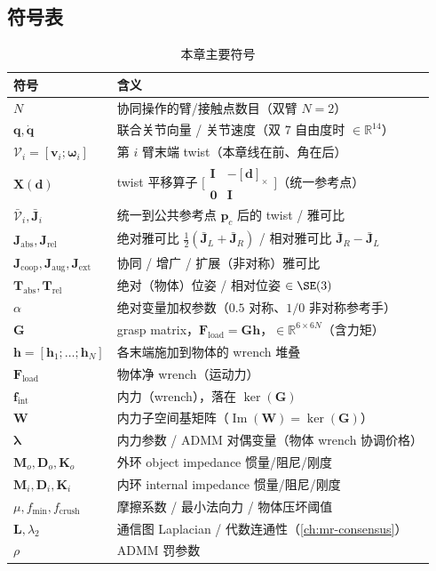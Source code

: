 \subsection*{符号表}
\begin{table}[H]\centering\small
\caption{本章主要符号}
\label{tab:ma-symbols}
\begin{tabular}{ll}
\toprule
符号 & 含义 \\
\midrule
$N$ & 协同操作的臂/接触点数目（双臂 $N=2$） \\
$\mathbf{q},\dot{\mathbf{q}}$ & 联合关节向量 / 关节速度（双 $7$ 自由度时 $\in\mathbb{R}^{14}$） \\
$\boldsymbol{\mathcal{V}}_i=[\mathbf{v}_i;\boldsymbol{\omega}_i]$ & 第 $i$ 臂末端 twist（本章线在前、角在后） \\
$\mathbf{X}(\mathbf{d})$ & twist 平移算子 $\big[\begin{smallmatrix}\mathbf{I}&-[\mathbf{d}]_\times\\\mathbf{0}&\mathbf{I}\end{smallmatrix}\big]$（统一参考点） \\
$\bar{\boldsymbol{\mathcal{V}}}_i,\bar{\mathbf{J}}_i$ & 统一到公共参考点 $\mathbf{p}_c$ 后的 twist / 雅可比 \\
$\mathbf{J}_{\text{abs}},\mathbf{J}_{\text{rel}}$ & 绝对雅可比 $\tfrac12(\bar{\mathbf{J}}_L+\bar{\mathbf{J}}_R)$ / 相对雅可比 $\bar{\mathbf{J}}_R-\bar{\mathbf{J}}_L$ \\
$\mathbf{J}_{\text{coop}},\mathbf{J}_{\text{aug}},\mathbf{J}_{\text{ext}}$ & 协同 / 增广 / 扩展（非对称）雅可比 \\
$\mathbf{T}_{\text{abs}},\mathbf{T}_{\text{rel}}$ & 绝对（物体）位姿 / 相对位姿 $\in\SE(3)$ \\
$\alpha$ & 绝对变量加权参数（$0.5$ 对称、$1/0$ 非对称参考手） \\
$\mathbf{G}$ & grasp matrix，$\mathbf{F}_{\text{load}}=\mathbf{G}\mathbf{h}$，$\in\mathbb{R}^{6\times6N}$（含力矩） \\
$\mathbf{h}=[\mathbf{h}_1;\dots;\mathbf{h}_N]$ & 各末端施加到物体的 wrench 堆叠 \\
$\mathbf{F}_{\text{load}}$ & 物体净 wrench（运动力） \\
$\mathbf{f}_{\text{int}}$ & 内力（wrench），落在 $\ker(\mathbf{G})$ \\
$\mathbf{W}$ & 内力子空间基矩阵（$\operatorname{Im}(\mathbf{W})=\ker(\mathbf{G})$） \\
$\boldsymbol{\lambda}$ & 内力参数 / ADMM 对偶变量（物体 wrench 协调价格） \\
$\mathbf{M}_o,\mathbf{D}_o,\mathbf{K}_o$ & 外环 object impedance 惯量/阻尼/刚度 \\
$\mathbf{M}_i,\mathbf{D}_i,\mathbf{K}_i$ & 内环 internal impedance 惯量/阻尼/刚度 \\
$\mu,f_{\min},f_{\text{crush}}$ & 摩擦系数 / 最小法向力 / 物体压坏阈值 \\
$\mathbf{L},\lambda_2$ & 通信图 Laplacian / 代数连通性（\cref{ch:mr-consensus}） \\
$\rho$ & ADMM 罚参数 \\
\bottomrule
\end{tabular}
\end{table}

